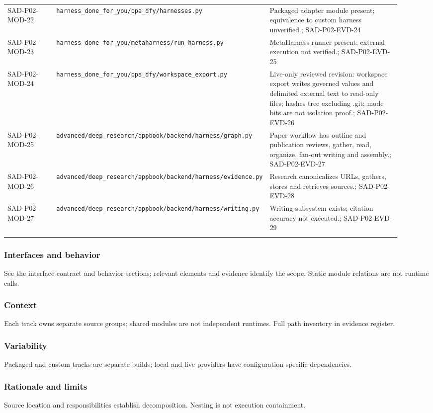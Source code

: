 \documentclass[10pt,letterpaper]{article}
\begin{document}
\begin{longtable}{@{}>{\raggedright\arraybackslash}p{0.15\linewidth}>{\raggedright\arraybackslash}p{0.34\linewidth}>{\raggedright\arraybackslash}p{0.43\linewidth}@{}}
SAD-P02-MOD-22 & \nolinkurl{harness_done_for_you/ppa_dfy/harnesses.py} & Packaged adapter module present; equivalence to custom harness unverified.; SAD-P02-EVD-24\\\addlinespace
SAD-P02-MOD-23 & \nolinkurl{harness_done_for_you/metaharness/run_harness.py} & MetaHarness runner present; external execution not verified.; SAD-P02-EVD-25\\\addlinespace
SAD-P02-MOD-24 & \nolinkurl{harness_done_for_you/ppa_dfy/workspace_export.py} & Live-only reviewed revision: workspace export writes governed values and delimited external text to read-only files; hashes tree excluding .git; mode bits are not isolation proof.; SAD-P02-EVD-26\\\addlinespace
SAD-P02-MOD-25 & \nolinkurl{advanced/deep_research/appbook/backend/harness/graph.py} & Paper workflow has outline and publication reviews, gather, read, organize, fan-out writing and assembly.; SAD-P02-EVD-27\\\addlinespace
SAD-P02-MOD-26 & \nolinkurl{advanced/deep_research/appbook/backend/harness/evidence.py} & Research canonicalizes URLs, gathers, stores and retrieves sources.; SAD-P02-EVD-28\\\addlinespace
SAD-P02-MOD-27 & \nolinkurl{advanced/deep_research/appbook/backend/harness/writing.py} & Writing subsystem exists; citation accuracy not executed.; SAD-P02-EVD-29\\\addlinespace
\bottomrule\end{longtable}

\subsubsection{Interfaces and behavior}
See the interface contract and behavior sections; relevant elements and evidence identify the scope. Static module relations are not runtime calls.
\subsubsection{Context}
Each track owns separate source groups; shared modules are not independent runtimes. Full path inventory in evidence register.
\subsubsection{Variability}
Packaged and custom tracks are separate builds; local and live providers have configuration-specific dependencies.
\subsubsection{Rationale and limits}
Source location and responsibilities establish decomposition. Nesting is not execution containment.
\end{document}
